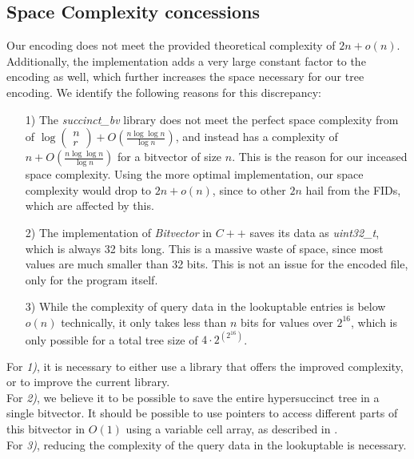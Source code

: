 \documentclass{article}
\begin{document}
\subsection{Space Complexity concessions} \label{Space Complexity concessions}
Our encoding does not meet the provided theoretical complexity of $2n + o(n)$. Additionally, the implementation adds a very large constant factor to the encoding as well, which further increases the space necessary for our tree encoding. We identify the following reasons for this discrepancy:\\
\begin{itemize}
	\item[1)] The \textit{succinct\_bv} library does not meet the perfect space complexity from \cite{succinctBV} of $\log \left( \!\begin{array}{c} n \\ r \end{array}\! \right) + O\left( \frac{n \log \log n}{\log n} \right)$, and instead has a complexity of $n + O\left( \frac{n \log \log n}{\log n} \right)$ for a bitvector of size $n$. This is the reason for our inceased space complexity. Using the more optimal implementation, our space complexity would drop to $2n + o(n)$, since to other $2n$ hail from the FIDs, which are affected by this.
	\item[2)] The implementation of \textit{Bitvector} in $C++$ saves its data as \textit{uint32\_t}, which is always 32 bits long. This is a massive waste of space, since most values are much smaller than 32 bits. This is not an issue for the encoded file, only for the program itself.
	\item[3)] While the complexity of query data in the lookuptable entries is below $o(n)$ technically, it only takes less than $n$ bits for values over $2^{16}$, which is only possible for a total tree size of $4 \cdot 2^{(2^{16})}$.
\end{itemize}
For \textit{1)}, it is necessary to either use a library that offers the improved complexity, or to improve the current library.\\
For \textit{2)}, we believe it to be possible to save the entire hypersuccinct tree in a single bitvector. It should be possible to use pointers to access different parts of this bitvector in $O(1)$ using a variable cell array, as described in \cite{universalSuccinct}.\\
For \textit{3)}, reducing the complexity of the query data in the lookuptable is necessary.
\end{document}
